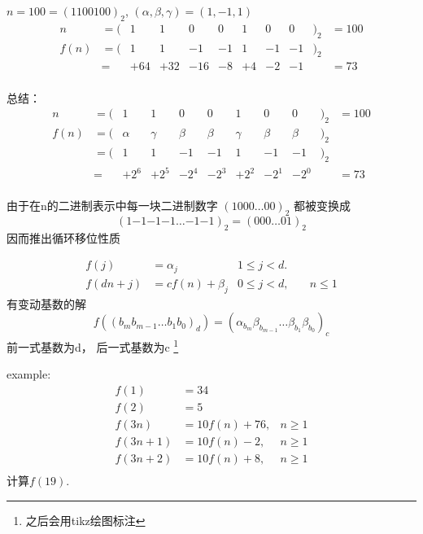 $ n = 100 = (1100100)_2 $, $ (\alpha, \beta, \gamma) = (1, -1, 1) $
\begin{equation*}
	\begin{array}{rlrrrrrrrll}
		n    &= ( &   1  &  1  &  0  &  0  &  1 &  0 &  0&)_2   &= 100  \\
		f(n) &= ( &   1  &  1  & -1  &  -1 &  1 & -1 & -1&)_2   &       \\
		     &=   & +64  & +32 & -16 &  -8 & +4 & -2 & -1&      &= 73   \\
	\end{array}
\end{equation*}

总结：
\begin{equation*}
	\begin{array}{rlrrrrrrrll}
		n    &= ( &   1     &  1       & 0     &  0     &  1      &  0    &  0    &)_2   &= 100  \\
		f(n) &= ( & \alpha  &  \gamma  & \beta &  \beta &  \gamma & \beta & \beta &)_2   &       \\
		     &= ( &   1     &  1       & -1    &  -1    &  1      & -1    & -1    &)_2   &       \\
		     &=   & +2^6    & +2^5     & -2^4  &  -2^3  & +2^2    & -2^1  & -2^0  &      &= 73   \\
	\end{array}
\end{equation*}

由于在n的二进制表示中每一块二进制数字 $ (1000\dots00)_{2} $ 都被变换成 
\begin{equation}\label{JnCurrBina}
	(1 {-1} {-1} {-1}\dots {-1} {-1})_{2} = (000\dots01)_{2}
\end{equation}
 因而推出循环移位性质

\begin{align*}
	f(j)    &= \alpha_{j}          & 1 \leqslant j < d. &                     \\
	f(dn+j) &= c f(n) + \beta_{j}  & 0 \leqslant j < d, &\quad n \leqslant 1  
\end{align*}
有变动基数的解
\begin{equation}\label{JnForDiffBase}
	f((b_m b_{m-1}\dots b_1 b_0)_{d}) = (\alpha_{b_{m}} \beta_{b_{m-1}}\dots \beta_{b_1} \beta_{b_0})_{c}
\end{equation}
前一式基数为d， 后一式基数为c \footnote{之后会用tikz绘图标注}


example:
\begin{align*}
	f(   1) &= 34              &               \\
	f(   2) &= 5               &               \\
	f(3n  ) &= 10f(n) + 76,    & n \geqslant 1 \\
	f(3n+1) &= 10f(n) -  2,    & n \geqslant 1 \\
	f(3n+2) &= 10f(n) +  8,    & n \geqslant 1 \\
\end{align*}
计算$ f(19) $.


